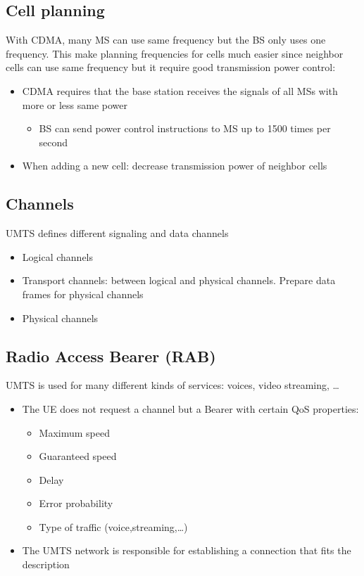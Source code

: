 \subsection{Cell planning}
With CDMA, many MS can use same frequency but the BS only uses one frequency.
This make planning frequencies for cells much easier since neighbor cells can use
same frequency but it require good transmission power control:
\begin{itemize}
	\item CDMA requires that the base station receives the signals 
	of all MSs with more or less same power
	\begin{itemize}
		\item BS can send power control instructions to MS up to
		1500 times per second
	\end{itemize}
	\item When adding a new cell: decrease transmission power of neighbor cells
\end{itemize}

\subsection{Channels}
UMTS defines different signaling and data channels
\begin{itemize}
	\item Logical channels
	\item Transport channels: between logical and physical channels.
	Prepare data frames for physical channels
	\item Physical channels
\end{itemize}

\subsection{Radio Access Bearer (RAB)}
UMTS is used for many different kinds of services: voices, video streaming, \ldots
\begin{itemize}
    \item The UE does not request a channel but a Bearer with certain QoS properties:
        \begin{itemize}
            \item Maximum speed
            \item Guaranteed speed
            \item Delay
            \item Error probability
            \item Type of traffic (voice,streaming,\ldots)
        \end{itemize}
    \item The UMTS network is responsible for establishing a connection that fits the 
        description
\end{itemize}

